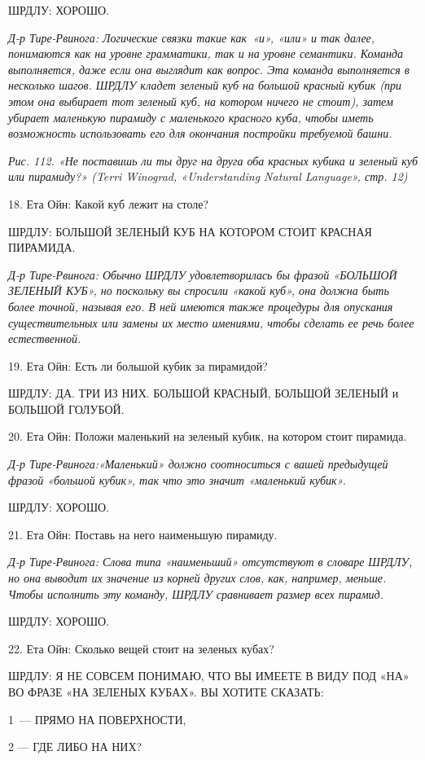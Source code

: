 ШРДЛУ: ХОРОШО.

\emph{Д-р Тире-Рвинога: Логические связки такие как~«и», «или» и так далее, понимаются как на уровне грамматики, так и на уровне семантики. Команда выполняется, даже если она выглядит как вопрос. Эта команда выполняется в несколько шагов. ШРДЛУ кладет зеленый куб на большой красный кубик (при этом она выбирает тот зеленый куб, на котором ничего не стоит), затем убирает маленькую пирамиду с маленького красного куба, чтобы иметь возможность использовать его для окончания постройки требуемой башни.}

\emph{Рис. 112. «Не поставишь ли ты друг на друга оба красных кубика и зеленый куб или пирамиду?» (Terri Winograd, «Understanding Natural Language», стр. 12)}

18. Ета Ойн: Какой куб лежит на столе?

ШРДЛУ: БОЛЬШОЙ ЗЕЛЕНЫЙ КУБ НА КОТОРОМ СТОИТ КРАСНАЯ ПИРАМИДА.

\emph{Д-р Тире-Рвинога: Обычно ШРДЛУ удовлетворилась бы фразой «БОЛЬШОЙ ЗЕЛЕНЫЙ КУБ», но поскольку вы спросили «какой куб», она должна быть более точной, называя его. В ней имеются также процедуры для опускания существительных или замены их место имениями, чтобы сделать ее речь более естественной.}

19. Ета Ойн: Есть ли большой кубик за пирамидой?

ШРДЛУ: ДА. ТРИ ИЗ НИХ. БОЛЬШОЙ КРАСНЫЙ, БОЛЬШОЙ ЗЕЛЕНЫЙ и БОЛЬШОЙ ГОЛУБОЙ.

20. Ета Ойн: Положи маленький на зеленый кубик, на котором стоит пирамида.

\emph{Д-р Тире-Рвинога:«Маленький» должно соотноситься с вашей предыдущей фразой «большой кубик», так что это значит «маленький кубик».}

ШРДЛУ: ХОРОШО.

21. Ета Ойн: Поставь на него наименьшую пирамиду.

\emph{Д-р Тире-Рвинога: Слова типа «наименьший» отсутствуют в словаре ШРДЛУ, но она выводит их значение из корней других слов, как, например, меньше. Чтобы исполнить эту команду, ШРДЛУ сравнивает размер всех пирамид.}

ШРДЛУ: ХОРОШО.

22. Ета Ойн: Сколько вещей стоит на зеленых кубах?

ШРДЛУ: Я НЕ СОВСЕМ ПОНИМАЮ, ЧТО ВЫ ИМЕЕТЕ В ВИДУ ПОД «НА» ВО ФРАЗЕ «НА ЗЕЛЕНЫХ КУБАХ». ВЫ ХОТИТЕ СКАЗАТЬ:

1~--- ПРЯМО НА ПОВЕРХНОСТИ,

2 --- ГДЕ ЛИБО НА НИХ?

